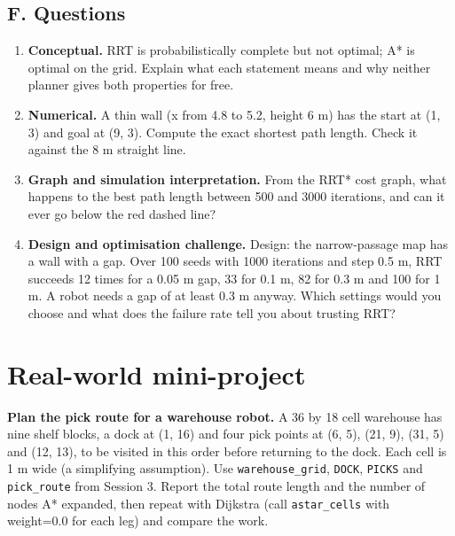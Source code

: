 \documentclass[11pt,a4paper]{article}
\begin{document}
\subsection*{F. Questions}
\begin{enumerate}[nosep]
\item \textbf{Conceptual.} RRT is probabilistically complete but not optimal; A* is optimal on the grid. Explain what each statement means and why neither planner gives both properties for free.
\item \textbf{Numerical.} A thin wall (x from 4.8 to 5.2, height 6 m) has the start at (1, 3) and goal at (9, 3). Compute the exact shortest path length. Check it against the 8 m straight line.
\item \textbf{Graph and simulation interpretation.} From the RRT* cost graph, what happens to the best path length between 500 and 3000 iterations, and can it ever go below the red dashed line?
\item \textbf{Design and optimisation challenge.} Design: the narrow-passage map has a wall with a gap. Over 100 seeds with 1000 iterations and step 0.5 m, RRT succeeds 12 times for a 0.05 m gap, 33 for 0.1 m, 82 for 0.3 m and 100 for 1 m. A robot needs a gap of at least 0.3 m anyway. Which settings would you choose and what does the failure rate tell you about trusting RRT?
\end{enumerate}

\section{Real-world mini-project}
\textbf{Plan the pick route for a warehouse robot.} A 36 by 18 cell warehouse has nine shelf blocks, a dock at (1, 16) and four pick points at (6, 5), (21, 9), (31, 5) and (12, 13), to be visited in this order before returning to the dock. Each cell is 1 m wide (a simplifying assumption). Use \texttt{warehouse\_grid}, \texttt{DOCK}, \texttt{PICKS} and \texttt{pick\_route} from Session 3. Report the total route length and the number of nodes A* expanded, then repeat with Dijkstra (call \texttt{astar\_cells} with weight=0.0 for each leg) and compare the work.
\end{document}
